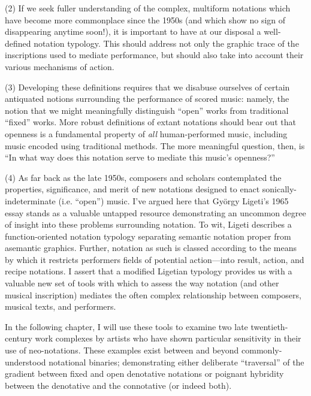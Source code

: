 (2) If we seek fuller understanding of the complex, multiform notations which have become more commonplace since the 1950s (and which show no sign of disappearing anytime soon!), it is important to have at our disposal a well-defined notation typology. This should address not only the graphic trace of the inscriptions used to mediate performance, but should also take into account their various mechanisms of action.

(3) Developing these definitions requires that we disabuse ourselves of certain antiquated notions surrounding the performance of scored music: namely, the notion that we might meaningfully distinguish ``open'' works from traditional ``fixed'' works. More robust definitions of extant notations should bear out that openness is a fundamental property of \textit{all} human-performed music, including music encoded using traditional methods. The more meaningful question, then, is ``In what way does this notation serve to mediate this music's openness?''

(4) As far back as the late 1950s, composers and scholars contemplated the properties, significance, and merit of new notations designed to enact sonically-indeterminate (i.e. ``open'') music. I've argued here that György Ligeti's 1965 essay stands as a valuable untapped resource demonstrating an uncommon degree of insight into these problems surrounding notation. To wit, Ligeti describes a function-oriented notation typology separating semantic notation proper from asemantic graphics. Further, notation as such is classed according to the means by which it restricts performers fields of potential action---into result, action, and recipe notations. I assert that a modified Ligetian typology provides us with a valuable new set of tools with which to assess the way notation (and other musical inscription) mediates the often complex relationship between composers, musical texts, and performers.

In the following chapter, I will use these tools to examine two late twentieth-century work complexes by artists who have shown particular sensitivity in their use of neo-notations. These examples exist between and beyond commonly-understood notational binaries; demonstrating either deliberate ``traversal'' of the gradient between fixed and open denotative notations or poignant hybridity between the denotative and the connotative (or indeed both). 


